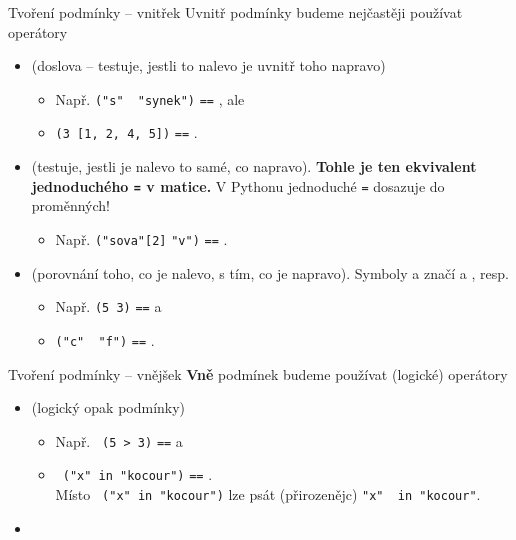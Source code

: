 \begin{frame}{Tvoření podmínky -- vnitřek}
  Uvnitř podmínky budeme nejčastěji používat operátory
  \begin{itemize}
   \item<1-> \texttt{} (doslova  -- testuje, jestli to nalevo je
    uvnitř toho napravo)
    \begin{itemize}
     \item Např. \texttt{("s"}~\texttt{ "synek")} \texttt{==}
      \texttt{}, ale
     \item \texttt{(3  [1, 2, 4, 5])} \texttt{==} \texttt{}.
    \end{itemize}
   \item<2-> \texttt{\mlb{==}} (testuje, jestli je nalevo to samé, co napravo).
    \textbf{Tohle je ten ekvivalent jednoduchého \texttt{=} v matice.} V Pythonu
    jednoduché \texttt{=} dosazuje do proměnných!
    \begin{itemize}
     \item Např. \texttt{("sova"[2]} \texttt{\mlb{==}} \texttt{"v")} \texttt{==}
      \texttt{}.
    \end{itemize}
   \item<3-> \texttt{\mlb{<,>,<=,>=}} (porovnání toho, co je nalevo, s tím, co
    je napravo). Symboly \texttt{\mlb{<=}} a \texttt{\mlb{>=}} značí  a , resp.
    \begin{itemize}
     \item Např. \texttt{(5 \mlb{>} 3)} \texttt{==} \texttt{} a
     \item \texttt{("c"~\mlb{<=} "f")} \texttt{==} \texttt{}.
    \end{itemize}
  \end{itemize}
\end{frame}

\begin{frame}{Tvoření podmínky -- vnějšek}
 \textbf{Vně} podmínek budeme používat (logické) operátory
 \begin{itemize}
  \item<1-> \texttt{} (logický opak podmínky)
   \begin{itemize}
    \item Např. \texttt{ (5 > 3)} \texttt{==} \texttt{} a
    \item \texttt{ ("x"~in "kocour")} \texttt{==} \texttt{}.\\
     Místo \texttt{ ("x"~in "kocour")} lze psát (přirozenějc)
     \texttt{"x"~ in "kocour"}.
   \end{itemize}
  \item 
 \end{itemize}
\end{frame}
